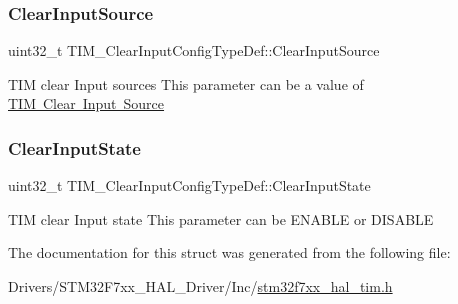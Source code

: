 \subsubsection{\texorpdfstring{ClearInputSource}{ClearInputSource}}
{\footnotesize\ttfamily uint32\+\_\+t T\+I\+M\+\_\+\+Clear\+Input\+Config\+Type\+Def\+::\+Clear\+Input\+Source}

T\+IM clear Input sources This parameter can be a value of \mbox{\hyperlink{group___t_i_m___clear_input___source}{T\+IM Clear Input Source}} \mbox{\label{struct_t_i_m___clear_input_config_type_def_a01d4b91dd297c4f0582a4d9179abf32f}} 
\subsubsection{\texorpdfstring{ClearInputState}{ClearInputState}}
{\footnotesize\ttfamily uint32\+\_\+t T\+I\+M\+\_\+\+Clear\+Input\+Config\+Type\+Def\+::\+Clear\+Input\+State}

T\+IM clear Input state This parameter can be E\+N\+A\+B\+LE or D\+I\+S\+A\+B\+LE 

The documentation for this struct was generated from the following file\+:\begin{DoxyCompactItemize}
\item 
Drivers/\+S\+T\+M32\+F7xx\+\_\+\+H\+A\+L\+\_\+\+Driver/\+Inc/\mbox{\hyperlink{stm32f7xx__hal__tim_8h}{stm32f7xx\+\_\+hal\+\_\+tim.\+h}}\end{DoxyCompactItemize}
